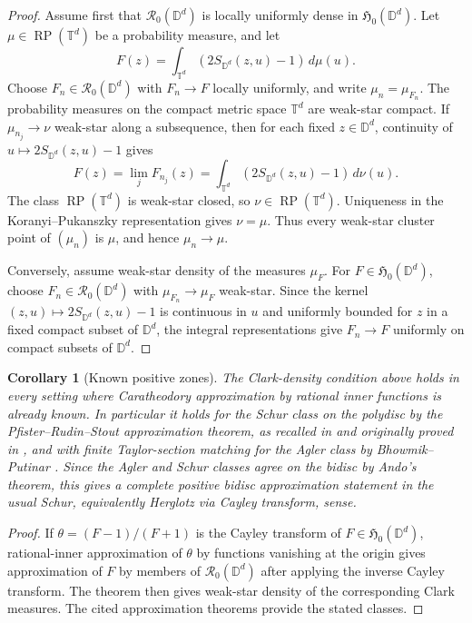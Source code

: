 \documentclass[11pt]{article}
\newtheorem{corollary}{Corollary}
\newcommand{\D}{\mathbb D}
\newcommand{\T}{\mathbb T}
\newcommand{\RP}{\operatorname{RP}}
\begin{document}
\begin{proof}
Assume first that \(\mathcal R_0(\D^d)\) is locally uniformly dense in
\(\mathfrak H_0(\D^d)\).  Let \(\mu\in\RP(\T^d)\) be a probability
measure, and let
\[
  F(z)=\int_{\T^d}\left(2S_{\D^d}(z,u)-1\right)\,d\mu(u).
\]
Choose \(F_n\in\mathcal R_0(\D^d)\) with \(F_n\to F\) locally uniformly,
and write \(\mu_n=\mu_{F_n}\).  The probability measures on the compact
metric space \(\T^d\) are weak-star compact.  If \(\mu_{n_j}\to\nu\)
weak-star along a subsequence, then for each fixed \(z\in\D^d\),
continuity of \(u\mapsto 2S_{\D^d}(z,u)-1\) gives
\[
  F(z)=\lim_j F_{n_j}(z)
  =\int_{\T^d}\left(2S_{\D^d}(z,u)-1\right)\,d\nu(u).
\]
The class \(\RP(\T^d)\) is weak-star closed, so \(\nu\in\RP(\T^d)\).
Uniqueness in the Koranyi--Pukanszky representation gives \(\nu=\mu\).
Thus every weak-star cluster point of \((\mu_n)\) is \(\mu\), and hence
\(\mu_n\to\mu\).

Conversely, assume weak-star density of the measures \(\mu_F\).  For
\(F\in\mathfrak H_0(\D^d)\), choose \(F_n\in\mathcal R_0(\D^d)\) with
\(\mu_{F_n}\to\mu_F\) weak-star.  Since the kernel
\((z,u)\mapsto2S_{\D^d}(z,u)-1\) is continuous in \(u\) and uniformly
bounded for \(z\) in a fixed compact subset of \(\D^d\), the integral
representations give \(F_n\to F\) uniformly on compact subsets of \(\D^d\).
\end{proof}

\begin{corollary}[Known positive zones]
The Clark-density condition above holds in every setting where
Caratheodory approximation by rational inner functions is already known.
In particular it holds for the Schur class on the polydisc by the
Pfister--Rudin--Stout approximation theorem, as recalled in
\cite[Sec. 5]{BP} and originally proved in \cite{RudinStout}, and with
finite Taylor-section matching for the Agler class by Bhowmik--Putinar
\cite{BP}.  Since the Agler and Schur classes agree on the bidisc by
Ando's theorem, this gives a complete positive bidisc approximation
statement in the usual Schur, equivalently Herglotz via Cayley transform,
sense.
\end{corollary}

\begin{proof}
If \(\theta=(F-1)/(F+1)\) is the Cayley transform of
\(F\in\mathfrak H_0(\D^d)\), rational-inner approximation of \(\theta\)
by functions vanishing at the origin gives approximation of \(F\) by
members of \(\mathcal R_0(\D^d)\) after applying the inverse Cayley
transform.  The theorem then gives weak-star density of the corresponding
Clark measures.  The cited approximation theorems provide the stated
classes.
\end{proof}
\end{document}
